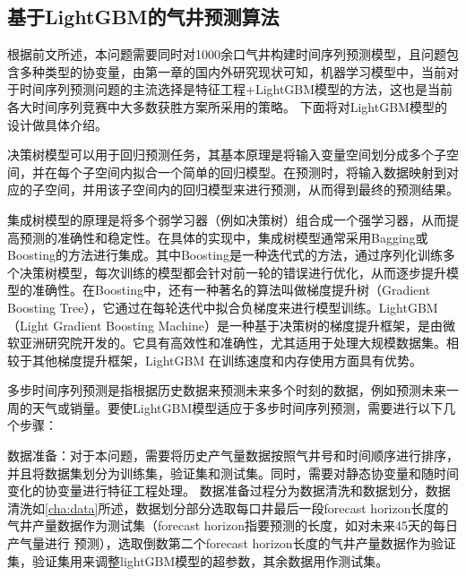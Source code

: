 \subsection{基于LightGBM的气井预测算法}
根据前文所述，本问题需要同时对1000余口气井构建时间序列预测模型，且问题包含多种类型的协变量，由第一章的国内外研究现状可知，机器学习模型中，当前对于时间序列预测问题的主流选择是特征工程+LightGBM模型的方法，这也是当前各大时间序列竞赛中大多数获胜方案所采用的策略。
下面将对LightGBM模型的设计做具体介绍。

决策树模型可以用于回归预测任务，其基本原理是将输入变量空间划分成多个子空间，并在每个子空间内拟合一个简单的回归模型。在预测时，将输入数据映射到对应的子空间，并用该子空间内的回归模型来进行预测，从而得到最终的预测结果。

集成树模型的原理是将多个弱学习器（例如决策树）组合成一个强学习器，从而提高预测的准确性和稳定性。在具体的实现中，集成树模型通常采用Bagging或Boosting的方法进行集成。其中Boosting是一种迭代式的方法，通过序列化训练多个决策树模型，每次训练的模型都会针对前一轮的错误进行优化，从而逐步提升模型的准确性。在Boosting中，还有一种著名的算法叫做梯度提升树（Gradient Boosting Tree），它通过在每轮迭代中拟合负梯度来进行模型训练。LightGBM（Light Gradient Boosting Machine）是一种基于决策树的梯度提升框架，是由微软亚洲研究院开发的。它具有高效性和准确性，尤其适用于处理大规模数据集。相较于其他梯度提升框架，LightGBM 在训练速度和内存使用方面具有优势。

多步时间序列预测是指根据历史数据来预测未来多个时刻的数据，例如预测未来一周的天气或销量。要使LightGBM模型适应于多步时间序列预测，需要进行以下几个步骤：

数据准备：对于本问题，需要将历史产气量数据按照气井号和时间顺序进行排序，并且将数据集划分为训练集，验证集和测试集。同时，需要对静态协变量和随时间变化的协变量进行特征工程处理。
数据准备过程分为数据清洗和数据划分，数据清洗如\ref{cha:data}所述，数据划分部分选取每口井最后一段forecast horizon长度的气井产量数据作为测试集（forecast horizon指要预测的长度，如对未来45天的每日产气量进行
预测），选取倒数第二个forecast horizon长度的气井产量数据作为验证集，验证集用来调整lightGBM模型的超参数，其余数据用作测试集。

